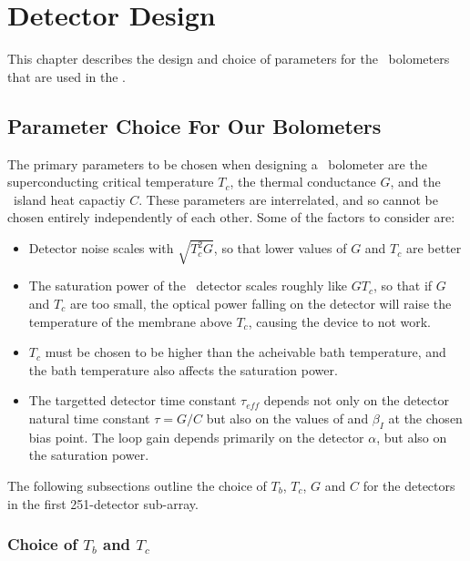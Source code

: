 \chapter{Detector Design}\label{c:det-design}

This chapter describes the design and choice of parameters for the \TES\ bolometers that are used in the \Imager.

\section{Parameter Choice For Our Bolometers} \label{sec:det-parm-choice}

The primary parameters to be chosen when designing a \TES\ bolometer are the superconducting critical temperature $T_c$, the thermal conductance $G$, and the \TES\ island heat capactiy $C$.
These parameters are interrelated, and so cannot be chosen entirely independently of each other.
Some of the factors to consider are:
\begin{itemize}
  \item Detector noise scales with $\sqrt{T_c^2 G}$, so that lower values of $G$ and $T_c$ are better
  \item The saturation power of the \TES\ detector scales roughly like $G T_c$, so that if $G$ and $T_c$ are too small, the optical power falling on the detector will raise the temperature of the membrane above $T_c$, causing the device to not work.
  \item $T_c$ must be chosen to be higher than the acheivable bath temperature, and the bath temperature also affects the saturation power.
  \item The targetted detector time constant $\tau_{eff}$ depends not only on the detector natural time constant $\tau = G / C$ but also on the values of \Loop and $\beta_I$ at the chosen bias point.
        The loop gain depends primarily on the detector $\alpha$, but also on the saturation power.
\end{itemize}


The following subsections outline the choice of $T_b$, $T_c$, $G$ and $C$ for the detectors in the first 251-detector sub-array.

\subsection{Choice of $T_b$ and $T_c$}

